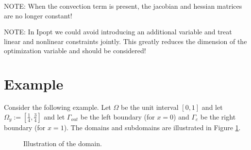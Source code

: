 \documentclass[
12pt, %
a4paper, %
onecolumn, %
portrait %
]{article}
\begin{document}
NOTE: When the convection term is present, the jacobian and hessian matrices are no longer constant!

NOTE: In Ipopt we could avoid introducing an additional variable and treat linear and nonlinear constraints jointly. This greatly reduces the dimension of the optimization variable and should be considered!

\section{Example}
Consider the following example. Let $\Omega$ be the unit interval $[0,1]$ and let $\Omega_y := [\frac{1}{4},\frac{3}{4}]$ and let $\Gamma_{out}$ be the left boundary (for $x=0$) and $\Gamma_c$ be the right boundary (for $x=1$). The domains and subdomains are illustrated in Figure \ref{fig:domain}.
\begin{figure}[h]
\begin{center}
\end{center}
\caption{Illustration of the domain.}
\label{fig:domain}
\end{figure}
\end{document}
